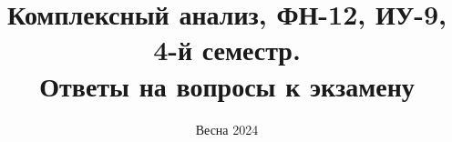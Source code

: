 \documentclass[a4paper, 14pt]{article}
\title{\textbf{Комплексный анализ, ФН-12, ИУ-9, 4-й семестр.\\Ответы на вопросы к экзамену\\}}
\author{  }
\date{Весна 2024}
\begin{document}
\maketitle
\renewcommand{\contentsname}{Содержание}
\setcounter{page}{2}
\tableofcontents

\LARGE

























\end{document}
